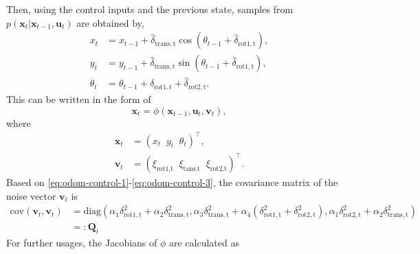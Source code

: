 Then, using the control inputs and the previous state, samples from $p(\mathbf{x}_t | \mathbf{x}_{t-1},\mathbf{u}_t)$
are obtained by,
\begin{align}
    x_t      & = x_{t-1} + \hat{\delta}_{\mathrm{trans,t}}\cos(\theta_{t-1} + \hat{\delta}_{\mathrm{rot1,t}}), \label{eq:prop-x} \\
    y_t      & = y_{t-1} + \hat{\delta}_{\mathrm{trans,t}}\sin(\theta_{t-1} + \hat{\delta}_{\mathrm{rot1,t}}), \label{eq:prop-y} \\
    \theta_t & = \theta_{t-1} + \hat{\delta}_{\mathrm{rot1,t}} + \hat{\delta}_{\mathrm{rot2,t}}. \label{eq:prop-theta}
\end{align}
This can be written in the form of
\begin{equation}
    \mathbf{x}_t = \phi(\mathbf{x}_{t-1},\mathbf{u}_t,\mathbf{v}_t),
\end{equation}
where
\begin{align}
    \mathbf{x}_t & = (x_t\;\;y_t\;\;\theta_t)^{\top},                                            \\
    \mathbf{v}_t & = (\xi_{\text{rot1,t}}\;\;\xi_{\text{tans,t}}\;\;\xi_{\text{rot2,t}})^{\top}.
\end{align}
Based on \eqref{eq:odom-control-1}-\eqref{eq:odom-control-3}, the covariance matrix of the noise
vector $\mathbf{v}_t$ is
\begin{align}\label{eq:control-covar}
    \text{cov}(\mathbf{v}_t,\mathbf{v}_t) & =
    \text{diag}(\alpha_1\delta_{\mathrm{rot1,t}}^2+\alpha_2\delta_{\mathrm{trans,t}}^2,
    \alpha_3\delta_{\mathrm{trans,t}}^2+\alpha_4(\delta_{\mathrm{rot1,t}}^2+\delta_{\mathrm{rot2,t}}^2),
    \alpha_1\delta_{\mathrm{rot2,t}}^2+\alpha_2\delta_{\mathrm{trans,t}}^2) \nonumber    \\
                                          & =:                              \mathbf{Q}_t
\end{align}
For further usages, the Jacobians of $\phi$ are calculated as
